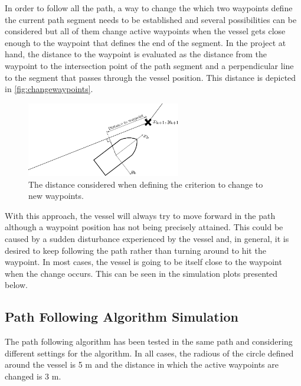 In order to follow all the path, a way to change the which two waypoints define the current path segment needs to be established and several possibilities can be considered but all of them change active waypoints when the vessel gets close enough to the waypoint that defines the end of the segment. In the project at hand, the distance to the waypoint is evaluated as the distance from the waypoint to the intersection point of the path segment and a perpendicular line to the segment that passes through the vessel position. This distance is depicted in \autoref{fig:changewaypoints}.
\begin{figure}[H]
	\includegraphics[width=0.6\textwidth]{figures/LOSalgorithmdistancewp}
	\caption{The distance considered when defining the criterion to change to new waypoints.}
	\label{fig:changewaypoints}
\end{figure}
With this approach, the vessel will always try to move forward in the path although a waypoint position has not being precisely attained. %
This could be caused by a sudden disturbance experienced by the vessel and, in general, it is desired to keep following the path rather than turning around to hit the waypoint. In most cases, the vessel is going to be itself close to the waypoint when the change occurs. This can be seen in the simulation plots presented below. 

\subsection{Path Following Algorithm Simulation}

The path following algorithm has been tested in the same path and considering different settings for the algorithm. In all cases, the radious of the circle defined around the vessel is 5 m and the distance in which the active waypoints are changed is 3 m. 

